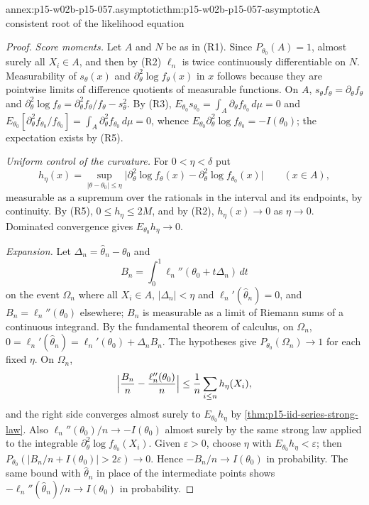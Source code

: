 \begin{annexitem}{annex:p15-w02b-p15-057.asymptotic}{thm:p15-w02b-p15-057-asymptotic}{A consistent root of the likelihood equation}
\begin{proof}
\emph{Score moments.} Let \(A\) and \(N\) be as in (R1). Since
\(P_{\theta_0}(A)=1\), almost surely all \(X_i\in A\), and then by (R2)
\(\ell_n\) is twice continuously differentiable on \(N\). Measurability
of \(s_\theta(x)\) and \(\partial_\theta^2\log f_\theta(x)\) in \(x\)
follows because they are pointwise limits of difference quotients of
measurable functions. On \(A\), \(s_{\theta}f_{\theta}=\partial_\theta
f_\theta\) and \(\partial_\theta^2\log f_\theta=\partial_\theta^2f_\theta
/f_\theta-s_\theta^2\). By (R3),
\(E_{\theta_0}s_{\theta_0}=\int_A\partial_\theta f_{\theta_0}\,d\mu=0\) and
\(E_{\theta_0}[\partial_\theta^2f_{\theta_0}/f_{\theta_0}]=\int_A
\partial_\theta^2f_{\theta_0}\,d\mu=0\), whence
\(E_{\theta_0}\partial_\theta^2\log f_{\theta_0}=-I(\theta_0)\); the
expectation exists by (R5).

\emph{Uniform control of the curvature.} For \(0<\eta<\delta\) put
\[
 h_\eta(x)=\sup_{|\theta-\theta_0|\leq\eta}
 \bigl|\partial_\theta^2\log f_\theta(x)-\partial_\theta^2\log
 f_{\theta_0}(x)\bigr|\qquad(x\in A),
\]
measurable as a supremum over the rationals in the interval and its
endpoints, by continuity. By (R5), \(0\leq h_\eta\leq2M\), and by (R2),
\(h_\eta(x)\to0\) as \(\eta\to0\). Dominated convergence gives
\(E_{\theta_0}h_\eta\to0\).

\emph{Expansion.} Let \(\Delta_n=\widehat\theta_n-\theta_0\) and
\[
 B_n=\int_0^1\ell_n''(\theta_0+t\Delta_n)\,dt
\]
on the event \(\Omega_n\) where all \(X_i\in A\), \(|\Delta_n|<\eta\) and
\(\ell_n'(\widehat\theta_n)=0\), and \(B_n=\ell_n''(\theta_0)\) elsewhere;
\(B_n\) is measurable as a limit of Riemann sums of a continuous integrand.
By the fundamental theorem of calculus, on \(\Omega_n\),
\(0=\ell_n'(\widehat\theta_n)=\ell_n'(\theta_0)+\Delta_nB_n\). The
hypotheses give \(P_{\theta_0}(\Omega_n)\to1\) for each fixed \(\eta\).
On \(\Omega_n\),
\[
 \Bigl|\frac{B_n}{n}-\frac{\ell_n''(\theta_0)}{n}\Bigr|
 \leq\frac1n\sum_{i\leq n}h_\eta(X_i),
\]
and the right side converges almost surely to \(E_{\theta_0}h_\eta\) by
\cref{thm:p15-iid-series-strong-law}. Also
\(\ell_n''(\theta_0)/n\to-I(\theta_0)\) almost surely by the same strong
law applied to the integrable \(\partial_\theta^2\log f_{\theta_0}(X_i)\).
Given \(\varepsilon>0\), choose \(\eta\) with
\(E_{\theta_0}h_\eta<\varepsilon\); then
\(P_{\theta_0}(|B_n/n+I(\theta_0)|>2\varepsilon)\to0\). Hence
\(-B_n/n\to I(\theta_0)\) in probability. The same bound with
\(\widehat\theta_n\) in place of the intermediate points shows
\(-\ell_n''(\widehat\theta_n)/n\to I(\theta_0)\) in probability.


\end{proof}
\end{annexitem}
